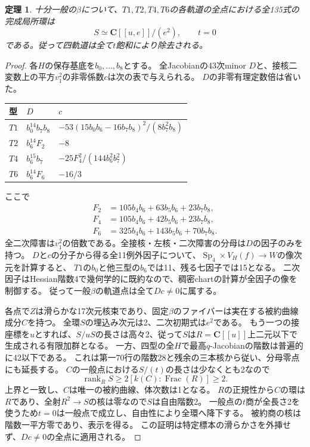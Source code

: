\documentclass[11pt,a4paper]{ltjsarticle}
\newcommand{\CC}{\mathbf C}
\DeclareMathOperator{\Sp}{Sp}
\DeclareMathOperator{\rank}{rank}
\newtheorem{theorem}{定理}[section]
\theoremstyle{remark}
\begin{document}
\begin{theorem}
十分一般の$\beta$について、$T1,T2,T4,T6$の各軌道の全点における全135式の完成局所環は
\[
 S\simeq\CC[[u,e]]/(e^2),\qquad t=0
\]
である。従って四軌道は全て$t$飽和により除去される。
\end{theorem}
\begin{proof}
各$H$の保存基底を$b_0,\ldots,b_8$とする。
全Jacobianの43次minor $D$と、接核二変数上の平方$v_1^2$の非零係数$c$は次の表で与えられる。
$D$の非零有理定数倍は省いた。
\begin{center}
\small
\begin{tabular}{lll}
\toprule
型 & $D$ & $c$\\
\midrule
$T1$ & $b_0^{14}b_7b_8$ & $-53(15b_0b_6-16b_7b_8)^2/(8b_7^2b_8)$\\
$T2$ & $b_6^{14}F_2$ & $-8$\\
$T4$ & $b_6^{15}b_7$ & $-25F_4^2/(144b_6^2b_7^2)$\\
$T6$ & $b_6^{14}F_6$ & $-16/3$\\
\bottomrule
\end{tabular}
\end{center}
ここで
\begin{align*}
F_2&=105b_4b_6+63b_5b_6+23b_7b_8,\\
F_4&=105b_4b_6+42b_5b_6+23b_7b_8,\\
F_6&=325b_4b_6+143b_5b_6+70b_7b_8.
\end{align*}
全二次障害は$v_1^2$の倍数である。全接核・左核・二次障害の分母は$D$の因子のみを持つ。
$D$と$c$の分子から得る全11例外因子について、$\Sp_4\times V_H(f)\to W$の像次元を計算すると、
$T1$の$b_0$と他三型の$b_6$では11、残る七因子では15となる。
二次因子はHessian階数4で幾何学的に既約なので、稠密chartの計算が全因子の像を制御する。
従って一般$\beta$の軌道点は全て$Dc\ne0$に属する\cite{mixed-exhaust-v39}。

各点で$Z$は滑らかな17次元核束であり、固定$\beta$のファイバーは実在する被約曲線成分$C$を持つ。
全環$S$の埋込み次元は2、二次初期式は$e^2$である。
もう一つの接座標を$u$とすれば、$S/uS$の長さは高々2、従って$S$は$R=\CC[[u]]$上二元以下で生成される有限加群となる。
一方、四型の全$H$で最高$q$-Jacobianの階数は普遍的に42以下である。
これは第一70行の階数28と残余の三本核から従い、分母零点にも延長する。
$C$の一般点における$S/(t)$の長さは少なくとも2なので
\[
 \rank_R S\ge 2[k(C):\operatorname{Frac}(R)]\ge2.
\]
上界と一致し、$C$は唯一の被約曲線、体次数は1となる。
$R$の正規性から$C$の環は$R$であり、全射$R^2\to S$の核は零なので$S$は自由階数2。
一般点の$t$商が全長さ2を使うため$t=0$は一般点で成立し、自由性により全環へ降下する。
被約商の核は階数一平方零であり、表示を得る。
この証明は特定標本の滑らかさを外挿せず、$Dc\ne0$の全点に適用される。
\end{proof}
\end{document}
